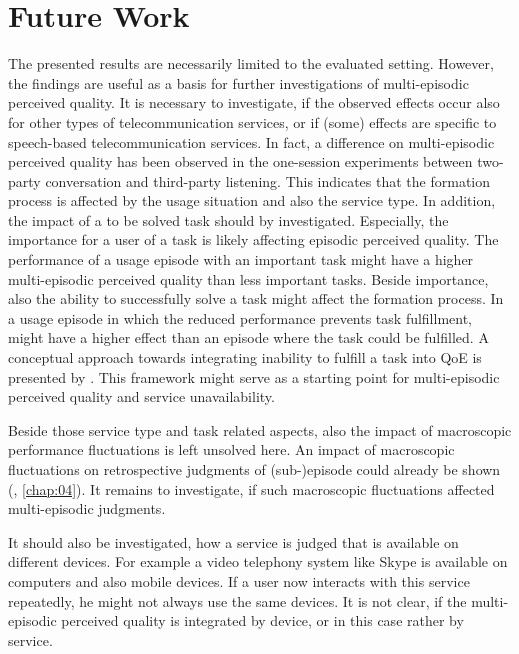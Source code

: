 \section{Future Work}
The presented results are necessarily limited to the evaluated setting.
However, the findings are useful as a basis for further investigations of multi-episodic perceived quality.
It is necessary to investigate, if the observed effects occur also for other types of telecommunication services, or if (some) effects are specific to speech-based telecommunication services.
In fact, a difference on multi-episodic perceived quality has been observed in the one-session experiments between two-party conversation and third-party listening.
This indicates that the formation process is affected by the usage situation and also the service type.
In addition, the impact of a to be solved task should by investigated.
Especially, the importance for a user of a task is likely affecting episodic perceived quality.
The performance of a usage episode with an important task might have a higher multi-episodic perceived quality than less important tasks.
Beside importance, also the ability to successfully solve a task might affect the formation process.
In a usage episode in which the reduced performance prevents task fulfillment, might have a higher effect than an episode where the task could be fulfilled.
A conceptual approach towards integrating inability to fulfill a task into \ac{QoE} is presented by \citet{leon-garcia_generalizing_2014}.
This framework might serve as a starting point for multi-episodic perceived quality and service unavailability.

Beside those service type and task related aspects, also the impact of macroscopic performance fluctuations is left unsolved here.
An impact of macroscopic fluctuations on retrospective judgments of (sub-)episode could already be shown (\cf, \autoref{chap:04}).
It remains to investigate, if such macroscopic fluctuations affected multi-episodic judgments.

It should also be investigated, how a service is judged that is available on different devices.
For example a video telephony system like Skype is available on computers and also mobile devices.
If a user now interacts with this service repeatedly, he might not always use the same devices.
It is not clear, if the multi-episodic perceived quality is integrated by device, or in this case rather by service.